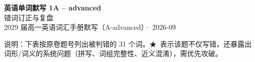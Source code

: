 \documentclass[11pt,a4paper]{article}
\newcommand{\STAR}{\textcolor{wrongred}{\starfont ★}}
\begin{document}
\begin{center}
{\LARGE\bfseries 英语单词默写 1\quad A -- advanced}\\[0.25em]
{\large 错词订正与复盘}\\[0.35em]
{\footnotesize 2029 届高一英语词汇手册默写（A-advanced）· 2026-09}
\end{center}

\vspace{-0.2em}
\noindent{\color{rulegray}\rule{\textwidth}{0.8pt}}

\vspace{0.7em}
\noindent{}

\vspace{0.8em}
\noindent 说明：下表按原卷题号列出被判错的 31 个词。\STAR\ 表示该题不仅写错，还暴露出词形/词义的系统问题（拼写、词组完整性、近义混淆），需优先攻破。
\end{document}
